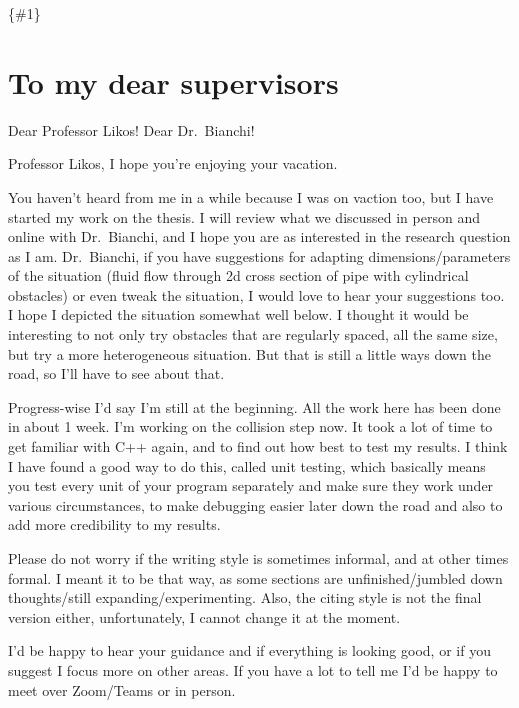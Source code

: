 \documentclass[
]{article}
\author{}
\date{}
\begin{document}
\newcommand{\matr}[1]\textbf

\{\#1\}

\newcommand{\vect}[1]{\vec{#1}}
\usepackage[table,xcdraw]{xcolor}

\hypertarget{to-my-dear-supervisors}{%
\section{To my dear supervisors}\label{to-my-dear-supervisors}}

Dear Professor Likos! Dear Dr.~Bianchi!

Professor Likos, I hope you're enjoying your vacation.

You haven't heard from me in a while because I was on vaction too, but I
have started my work on the thesis. I will review what we discussed in
person and online with Dr.~Bianchi, and I hope you are as interested in
the research question as I am. Dr.~Bianchi, if you have suggestions for
adapting dimensions/parameters of the situation (fluid flow through 2d
cross section of pipe with cylindrical obstacles) or even tweak the
situation, I would love to hear your suggestions too. I hope I depicted
the situation somewhat well below. I thought it would be interesting to
not only try obstacles that are regularly spaced, all the same size, but
try a more heterogeneous situation. But that is still a little ways down
the road, so I'll have to see about that.

Progress-wise I'd say I'm still at the beginning. All the work here has
been done in about 1 week. I'm working on the collision step now. It
took a lot of time to get familiar with C++ again, and to find out how
best to test my results. I think I have found a good way to do this,
called unit testing, which basically means you test every unit of your
program separately and make sure they work under various circumstances,
to make debugging easier later down the road and also to add more
credibility to my results.

Please do not worry if the writing style is sometimes informal, and at
other times formal. I meant it to be that way, as some sections are
unfinished/jumbled down thoughts/still expanding/experimenting. Also,
the citing style is not the final version either, unfortunately, I
cannot change it at the moment.

I'd be happy to hear your guidance and if everything is looking good, or
if you suggest I focus more on other areas. If you have a lot to tell me
I'd be happy to meet over Zoom/Teams or in person.
\end{document}
